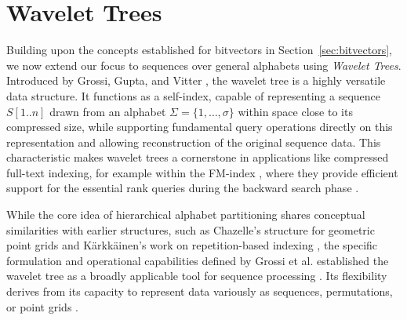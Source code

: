 \section{Wavelet Trees} \label{sec:wavelet_trees}

Building upon the concepts established for bitvectors in Section~\ref{sec:bitvectors}, we now extend our focus to sequences over general alphabets using \emph{Wavelet Trees}. Introduced by Grossi, Gupta, and Vitter \cite{GrossiWT2003}, the wavelet tree is a highly versatile data structure. It functions as a self-index, capable of representing a sequence $S[1..n]$ drawn from an alphabet $\Sigma = \{1, \dots, \sigma\}$ within space close to its compressed size, while supporting fundamental query operations directly on this representation and allowing reconstruction of the original sequence data. This characteristic makes wavelet trees a cornerstone in applications like compressed full-text indexing, for example within the FM-index \cite{ferragina2000opportunistic}, where they provide efficient support for the essential \textsf{rank} queries during the backward search phase \cite{WTForALL}.

While the core idea of hierarchical alphabet partitioning shares conceptual similarities with earlier structures, such as Chazelle's structure for geometric point grids \cite{Chazelle1988} and Kärkkäinen's work on repetition-based indexing \cite{karkkainen1999repetition}, the specific formulation and operational capabilities defined by Grossi et al. \cite{GrossiWT2003} established the wavelet tree as a broadly applicable tool for sequence processing \cite{WTForALL}. Its flexibility derives from its capacity to represent data variously as sequences, permutations, or point grids \cite{WTForALL, WTFromTheoryToPractice, TheMyriadVirtuesWT}.

